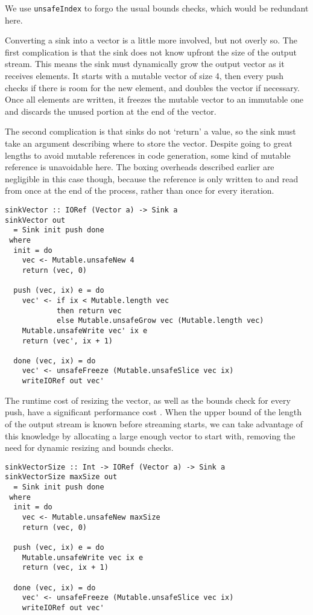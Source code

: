 We use \lstinline/unsafeIndex/ to forgo the usual bounds checks, which would be redundant here.

Converting a sink into a vector is a little more involved, but not overly so.
The first complication is that the sink does not know upfront the size of the output stream.
This means the sink must dynamically grow the output vector as it receives elements.
It starts with a mutable vector of size 4, then every push checks if there is room for the new element, and doubles the vector if necessary.
Once all elements are written, it freezes the mutable vector to an immutable one and discards the unused portion at the end of the vector.

The second complication is that sinks do not `return' a value, so the sink must take an argument describing where to store the vector.
Despite going to great lengths to avoid mutable references in code generation, some kind of mutable reference is unavoidable here.
The boxing overheads described earlier are negligible in this case though, because the reference is only written to and read from once at the end of the process, rather than once for every iteration.

\begin{lstlisting}
sinkVector :: IORef (Vector a) -> Sink a
sinkVector out
  = Sink init push done
 where
  init = do
    vec <- Mutable.unsafeNew 4
    return (vec, 0)

  push (vec, ix) e = do
    vec' <- if ix < Mutable.length vec
            then return vec
            else Mutable.unsafeGrow vec (Mutable.length vec)
    Mutable.unsafeWrite vec' ix e
    return (vec', ix + 1)

  done (vec, ix) = do
    vec' <- unsafeFreeze (Mutable.unsafeSlice vec ix)
    writeIORef out vec'
\end{lstlisting}

The runtime cost of resizing the vector, as well as the bounds check for every push, have a significant performance cost .
When the upper bound of the length of the output stream is known before streaming starts, we can take advantage of this knowledge by allocating a large enough vector to start with, removing the need for dynamic resizing and bounds checks.


\begin{lstlisting}
sinkVectorSize :: Int -> IORef (Vector a) -> Sink a
sinkVectorSize maxSize out
  = Sink init push done
 where
  init = do
    vec <- Mutable.unsafeNew maxSize
    return (vec, 0)

  push (vec, ix) e = do
    Mutable.unsafeWrite vec ix e
    return (vec, ix + 1)

  done (vec, ix) = do
    vec' <- unsafeFreeze (Mutable.unsafeSlice vec ix)
    writeIORef out vec'
\end{lstlisting}

